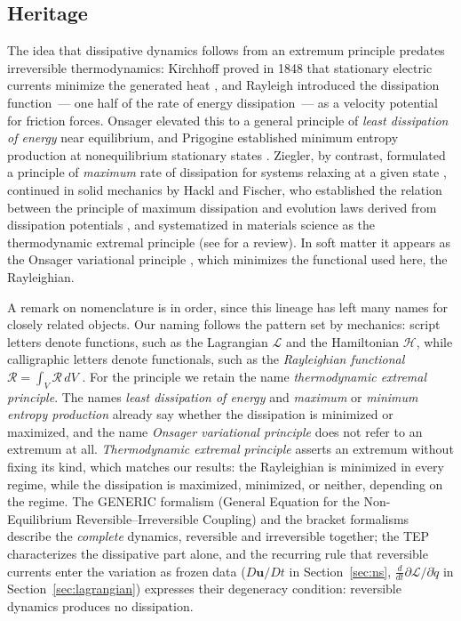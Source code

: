 \documentclass[12pt]{article}
\newif\ifhighlight \highlightfalse
\DeclareRobustCommand{\chgb}[1]{\ifhighlight\textcolor{revisedb}{#1}\else#1\fi}
\begin{document}
\subsection{Heritage}
\label{sec:heritage}

The idea that dissipative dynamics follows from an extremum principle predates irreversible thermodynamics: Kirchhoff proved in 1848 that stationary electric currents minimize the generated heat \cite{kirchhoff1848}, and Rayleigh \cite{rayleigh1873} introduced the dissipation function~--- one half of the rate of energy dissipation~--- as a velocity potential for friction forces. Onsager \cite{onsager1931reciprocal} elevated this to a general principle of \textit{least dissipation of energy} near equilibrium, and Prigogine established minimum entropy production at nonequilibrium stationary states \cite{kondepudi2014modern}. Ziegler, by contrast, formulated a principle of \textit{maximum} rate of dissipation for systems relaxing at a given state \cite{ziegler1963}, continued in solid mechanics by Hackl and Fischer, who established the relation between the principle of maximum dissipation and evolution laws derived from dissipation potentials \cite{hackl2008}, and systematized in materials science as the thermodynamic extremal principle \cite{svoboda2005application, fischer2014review, emmerich2003diffuse} (see \cite{martyushev2006} for a review). In soft matter it appears as the Onsager variational principle \cite{doi2011}, \chgb{which minimizes the functional used here, the Rayleighian}.

A remark on nomenclature is in order, since this lineage has left many names for closely related objects. Our naming follows the pattern set by mechanics: script letters denote functions, such as the Lagrangian $\mathscr{L}$ and the Hamiltonian $\mathscr{H}$, while calligraphic letters denote functionals, such as the \textit{Rayleighian functional} $\mathcal{R} = \int_V \mathscr{R}\, dV$ \cite{doi2011, beris2024}. For the principle we retain \chgb{the name} \textit{thermodynamic extremal principle}\chgb{. The names \textit{least dissipation of energy} and \textit{maximum} or \textit{minimum entropy production} already say whether the dissipation is minimized or maximized, and the name \textit{Onsager variational principle} does not refer to an extremum at all. \textit{Thermodynamic extremal principle} asserts an extremum without fixing its kind, which matches our results: the Rayleighian is minimized in every regime, while the dissipation is maximized, minimized, or neither, depending on the regime. The GENERIC formalism (General Equation for the Non-Equilibrium Reversible--Irreversible Coupling)} and the bracket formalisms \cite{grmela1997, beris2024} describe the \textit{complete} dynamics, reversible and irreversible together; the TEP characterizes the dissipative part alone, and the recurring rule that reversible currents enter the variation as frozen data ($D\boldsymbol{u}/Dt$ in Section~\ref{sec:ns}, $\tfrac{d}{dt}\partial \mathscr{L}/\partial \dot{q}$ in Section~\ref{sec:lagrangian}) expresses their degeneracy condition: reversible dynamics produces no dissipation.
\end{document}
